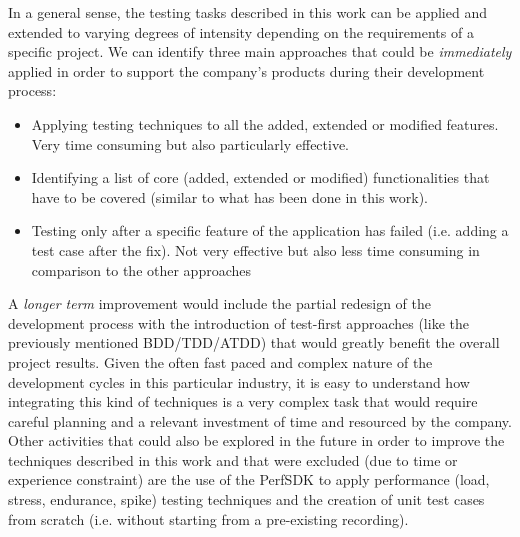 In a general sense, the testing tasks described in this work can be applied and extended to varying degrees of intensity depending on the requirements of a specific project. We can identify three main approaches that could be \textit{immediately} applied in order to support the company's products during their development process:
\begin{itemize}
    \item Applying testing techniques to all the added, extended or modified features. Very time consuming but also particularly effective.
    \item Identifying a list of core (added, extended or modified) functionalities that have to be covered (similar to what has been done in this work). 
    \item Testing only after a specific feature of the application has failed (i.e. adding a test case after the fix). Not very effective but also less time consuming in comparison to the other approaches 
\end{itemize}
A \textit{longer term} improvement would include the partial redesign of the development process with the introduction of test-first approaches (like the previously mentioned BDD/TDD/ATDD) that would greatly benefit the overall project results. Given the often fast paced and complex nature of the development cycles in this particular industry, it is easy to understand how integrating this kind of techniques is a very complex task that would require careful planning and a relevant investment of time and resourced by the company.
Other activities that could also be explored in the future in order to improve the techniques described in this work and that were excluded (due to time or experience constraint) are the use of the PerfSDK to apply performance (load, stress, endurance, spike) testing techniques and the creation of unit test cases from scratch (i.e. without starting from a pre-existing recording).
